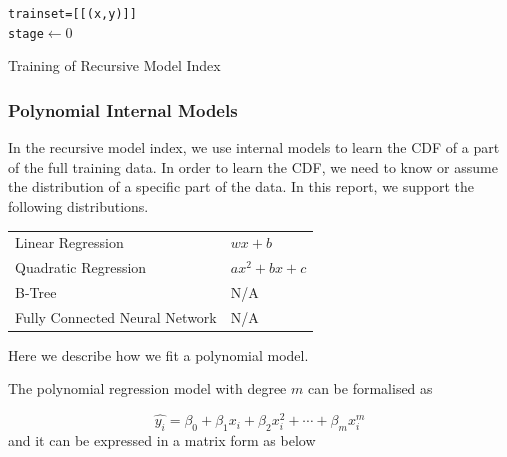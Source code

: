 \begin{algorithm}[H]
    \SetAlgoLined
     \texttt{trainset=[[(x,y)]]} \\
     \texttt{stage$\gets 0$} \\
     \caption{Training of Recursive Model Index}
\end{algorithm}

\subsubsection{Polynomial Internal Models}

In the recursive model index, we use internal models to learn the CDF of a part of the full training data. In order to learn the CDF, we need to know or assume the distribution of a specific part of the data. In this report, we support the following distributions.

\begin{table}[h]
  \begin{tabularx}{\textwidth}{@{}XX@{}}
  \toprule
    Linear Regression & $wx+b$ \\
    Quadratic Regression & $ax^2+bx+c$ \\
    B-Tree & N/A \\
    Fully Connected Neural Network & N/A \\
  \bottomrule
  \end{tabularx}
  \end{table}

Here we describe how we fit a polynomial model.

The polynomial regression model with degree $m$ can be formalised as 

$$ \hat{y_i}= \beta_0+\beta_1x_i+\beta_2x_i^2+\cdots+\beta_mx_i^m$$ and it can be expressed in a matrix form as below

